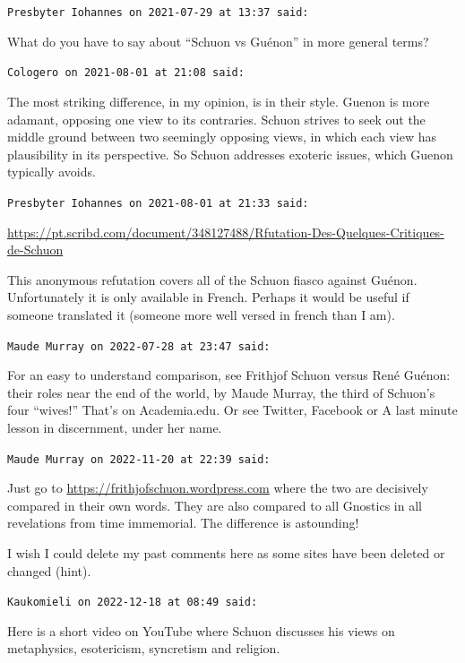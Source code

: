 \begin{footnotesize}
\begin{sffamily}
\texttt{Presbyter Iohannes on 2021-07-29 at 13:37 said:}

What do you have to say about ``Schuon vs Guénon'' in more general terms?

\hfill

\texttt{Cologero on 2021-08-01 at 21:08 said:}

The most striking difference, in my opinion, is in their style. Guenon is more adamant, opposing one view to its contraries. Schuon strives to seek out the middle ground between two seemingly opposing views, in which each view has plausibility in its perspective. So Schuon addresses exoteric issues, which Guenon typically avoids.

\hfill

\texttt{Presbyter Iohannes on 2021-08-01 at 21:33 said:}

\url{https://pt.scribd.com/document/348127488/Rfutation-Des-Quelques-Critiques-de-Schuon}


This anonymous refutation covers all of the Schuon fiasco against Guénon. Unfortunately it is only available in French. Perhaps it would be useful if someone translated it (someone more well versed in french than I am).

\hfill

\texttt{Maude Murray on 2022-07-28 at 23:47 said:}

For an easy to understand comparison, see Frithjof Schuon versus René Guénon: their roles near the end of the world, by Maude Murray, the third of Schuon's four ``wives!'' That's on Academia.edu. Or see Twitter, Facebook or A last minute lesson in discernment, under her name.

\hfill

\texttt{Maude Murray on 2022-11-20 at 22:39 said:}

Just go to \url{https://frithjofschuon.wordpress.com} where the two are decisively compared in their own words. They are also compared to all Gnostics in all revelations from time immemorial. The difference is astounding!

I wish I could delete my past comments here as some sites have been deleted or changed (hint).

\texttt{Kaukomieli on 2022-12-18 at 08:49 said:}

Here is a short video on YouTube where Schuon discusses his views on metaphysics, esotericism, syncretism and religion.


\end{sffamily}
\end{footnotesize}
